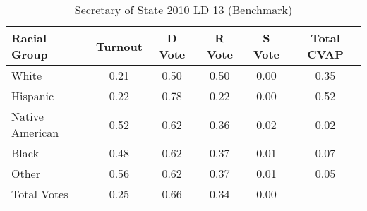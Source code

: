 \begin{table}[htb]
\begin{center}
\caption{Secretary of State 2010 LD 13 (Benchmark)}
\label{sos10_cvap_ld_13_benchmark}
\begin{tabular}{lccccc}
  \hline
Racial Group & Turnout & D Vote & R Vote & S Vote & Total CVAP \\ 
  \hline
White & 0.21 & 0.50 & 0.50 & 0.00 & 0.35 \\ 
  Hispanic & 0.22 & 0.78 & 0.22 & 0.00 & 0.52 \\ 
  Native American & 0.52 & 0.62 & 0.36 & 0.02 & 0.02 \\ 
  Black & 0.48 & 0.62 & 0.37 & 0.01 & 0.07 \\ 
  Other & 0.56 & 0.62 & 0.37 & 0.01 & 0.05 \\ 
  Total Votes & 0.25 & 0.66 & 0.34 & 0.00 &  \\ 
   \hline
\end{tabular}
\end{center}
\end{table}
